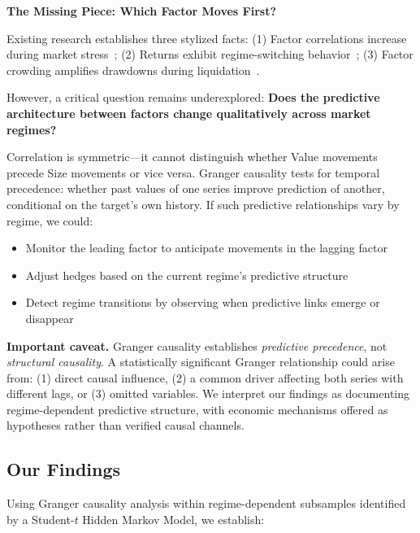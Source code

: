 \documentclass{uai2026}
\begin{document}
\textbf{The Missing Piece: Which Factor Moves First?}

Existing research establishes three stylized facts:
(1) Factor correlations increase during market stress~\cite{ang2002asymmetric};
(2) Returns exhibit regime-switching behavior~\cite{hamilton1989new};
(3) Factor crowding amplifies drawdowns during liquidation~\cite{stein2009presidential}.

However, a critical question remains underexplored: \textbf{Does the predictive
architecture between factors change qualitatively across market regimes?}

Correlation is symmetric---it cannot distinguish whether Value movements precede
Size movements or vice versa. Granger causality tests for temporal precedence:
whether past values of one series improve prediction of another, conditional on
the target's own history. If such predictive relationships vary by regime, we could:
\begin{itemize}
    \item Monitor the leading factor to anticipate movements in the lagging factor
    \item Adjust hedges based on the current regime's predictive structure
    \item Detect regime transitions by observing when predictive links emerge or disappear
\end{itemize}

\textbf{Important caveat.} Granger causality establishes \emph{predictive precedence},
not \emph{structural causality}. A statistically significant Granger relationship
could arise from: (1) direct causal influence, (2) a common driver affecting both
series with different lags, or (3) omitted variables. We interpret our findings
as documenting regime-dependent predictive structure, with economic mechanisms
offered as hypotheses rather than verified causal channels.

\subsection{Our Findings}

Using Granger causality analysis within regime-dependent subsamples identified by
a Student-$t$ Hidden Markov Model, we establish:
\end{document}
